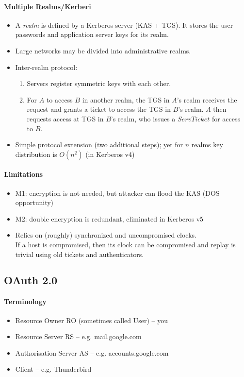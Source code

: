 \paragraph{Multiple Realms/Kerberi}
\begin{itemize}
    \item A \emph{realm} is defined by a Kerberos server (KAS + TGS). It stores the user passwords and application server keys for its realm.
    \item Large networks may be divided into administrative realms.
    \item Inter-realm protocol:
        \begin{enumerate}
            \item Servers register symmetric keys with each other.
            \item For $A$ to access $B$ in another realm, the TGS in $A$’s realm receives the request and grants a ticket to access the TGS in $B$’s realm. $A$ then requests access at TGS in $B$'s realm, who issues a $ServTicket$ for access to $B$.
        \end{enumerate}
    \item Simple protocol extension (two additional steps); yet for $n$ realms key distribution is $O(n^2)$ (in Kerberos v4)
\end{itemize}

\paragraph{Limitations}
\begin{itemize}
    \item M1: encryption is not needed, but attacker can flood the KAS (DOS opportunity)
    \item M2: double encryption is redundant, eliminated in Kerberos v5
    \item Relies on (roughly) synchronized and uncompromised clocks.\\
    If a host is compromised, then its clock can be compromised and replay is trivial using old tickets and authenticators.
\end{itemize}


\newpage
\subsection{OAuth 2.0}

\paragraph{Terminology}
\begin{itemize}
    \item Resource Owner RO (sometimes called User) -- you
    \item Resource Server RS -- e.g. mail.google.com
    \item Authorisation Server AS -- e.g. accounts.google.com
    \item Client -- e.g. Thunderbird
\end{itemize}


